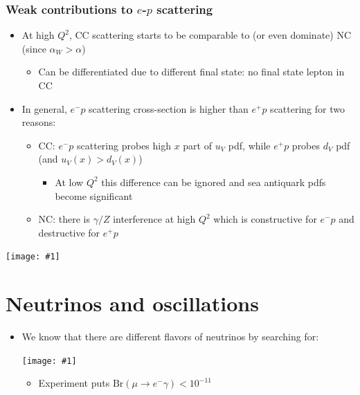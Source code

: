 \documentclass[11pt]{article}
\newcommand{\el}{\ensuremath{e^{-}}}
\newcommand{\pos}{\ensuremath{e^{+}}}
\newcommand{\embedimgw}[2]{\begin{center}\texttt{[image: \#1]}\end{center}}
\begin{document}
\subsubsection{Weak contributions to $e$-$p$ scattering}
\begin{itemize}
  \item At high $Q^2$, CC scattering starts to be comparable to (or even dominate) NC (since $\alpha_W > \alpha$)
  \begin{itemize}
    \item Can be differentiated due to different final state: no final state lepton in CC
  \end{itemize}
  \item In general, $\el p$ scattering cross-section is higher than $\pos p$ scattering for two reasons:
  \begin{itemize}
    \item CC: $\el p$ scattering probes high $x$ part of $u_V$ pdf, while $\pos p$ probes $d_V$ pdf (and $u_V(x) > d_V(x)$)
    \begin{itemize}
      \item At low $Q^2$ this difference can be ignored and sea antiquark pdfs become significant
    \end{itemize}
    \item NC: there is $\gamma/Z$ interference at high $Q^2$ which is constructive for $\el p$ and destructive for $\pos p$
  \end{itemize}
\end{itemize}
\embedimgw{figs/weakdis.png}{.4}

\section{Neutrinos and oscillations}
\begin{itemize}
  \item We know that there are different flavors of neutrinos by searching for:
  \embedimgw{figs/mu2e.png}{.3}
  \begin{itemize}
    \item Experiment puts $\text{Br}(\mu\rightarrow\el\gamma)<10^{-11}$
  \end{itemize}
\end{itemize}
\end{document}
